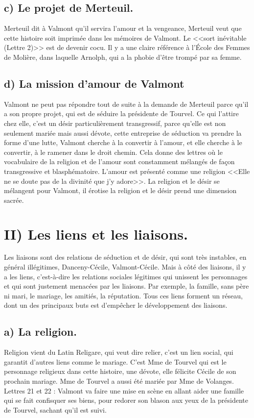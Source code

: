 \documentclass[12pt]{article}
\begin{document}
\subsection*{c) Le projet de Merteuil.}
Merteuil dit à Valmont qu'il servira l'amour et la vengeance, Merteuil veut que cette histoire soit imprimée dans les mémoires de Valmont. Le <<sort inévitable (Lettre 2)>> est de devenir cocu.
Il y a une claire référence à l'École des Femmes de Molière, dans laquelle Arnolph, qui a la phobie d'être trompé par sa femme.
\subsection*{d) La mission d'amour de Valmont}
Valmont ne peut pas répondre tout de suite à la demande de Merteuil parce qu'il a son propre projet, qui est de séduire la présidente de Tourvel.
Ce qui l'attire chez elle, c'est un désir particulièrement transgressif, parce qu'elle est non seulement mariée mais aussi dévote, cette entreprise de séduction va prendre la forme d'une lutte, Valmont cherche à la convertir à l'amour, et elle cherche à le convertir, à le ramener dans le droit chemin.
Cela donne des lettres où le vocabulaire de la religion et de l'amour sont constamment mélangés de façon transgressive et blasphématoire.
L'amour est présenté  comme une religion <<Elle ne se doute pas de la divinité que j'y adore>>.
La religion et le désir se mélangent pour Valmont, il érotise la religion et le désir prend une dimension sacrée.
\section*{II) Les liens et les liaisons.}
Les liaisons sont des relations de séduction et de désir, qui sont très instables, en général illégitimes, Danceny-Cécile, Valmont-Cécile.
Mais à côté des liaisons, il y a les liens, c'est-à-dire les relations sociales légitimes qui unissent les personnages et qui sont justement menacées par les liaisons.
Par exemple, la famille, sans père ni mari, le mariage, les amitiés, la réputation. Tous ces liens forment un réseau, dont un des principaux buts est d'empêcher le développement des liaisons.
\pagebreak
\subsection*{a) La religion.}
Religion vient du Latin Religare, qui veut dire relier, c'est un lien social, qui garantit d'autres liens comme le mariage.
C'est Mme de Tourvel qui est le personnage religieux dans cette histoire, une dévote, elle félicite Cécile de son prochain mariage.
Mme de Tourvel a aussi été mariée par Mme de Volanges.
Lettres 21 et 22 : Valmont va faire une mise en scène en allant aider une famille qui se fait confisquer ses biens, pour redorer son blason aux yeux de la présidente de Tourvel, sachant qu'il est suivi.
\end{document}
